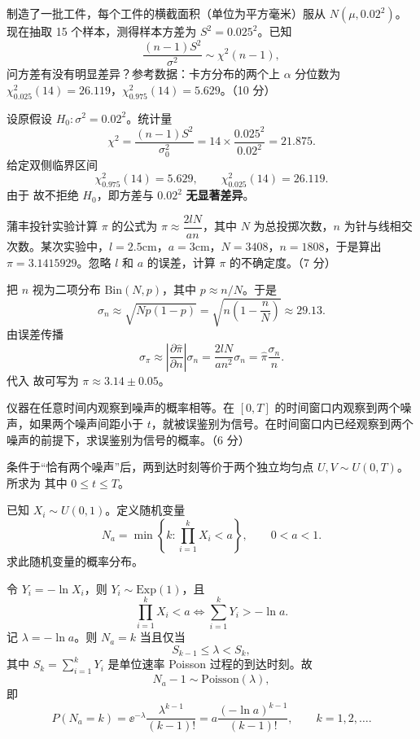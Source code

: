 \begin{question}
制造了一批工件，每个工件的横截面积（单位为平方毫米）服从 $N(\mu,0.02^2)$。现在抽取 15 个样本，测得样本方差为 $S^2=0.025^2$。已知
\[
\frac{(n-1)S^2}{\sigma^2}\sim \chi^2(n-1),
\]
问方差有没有明显差异？参考数据：卡方分布的两个上 $\alpha$ 分位数为 $\chi^2_{0.025}(14)=26.119$，$\chi^2_{0.975}(14)=5.629$。（10 分）
\begin{solution}
设原假设 $H_0:\sigma^2=0.02^2$。统计量
\[
\chi^2=\frac{(n-1)S^2}{\sigma_0^2}=14\times\frac{0.025^2}{0.02^2}=21.875.
\]
给定双侧临界区间
\[
\chi^2_{0.975}(14)=5.629,\qquad \chi^2_{0.025}(14)=26.119.
\]
由于
故不拒绝 $H_0$，即方差与 $0.02^2$ \textbf{无显著差异}。

\end{solution}
\end{question}

\begin{question}
蒲丰投针实验计算 $\pi$ 的公式为 $\pi\approx\dfrac{2lN}{an}$，其中 $N$ 为总投掷次数，$n$ 为针与线相交次数。某次实验中，$l=2.5\mathrm{cm}$，$a=3\mathrm{cm}$，$N=3408$，$n=1808$，于是算出 $\pi=3.1415929$。忽略 $l$ 和 $a$ 的误差，计算 $\pi$ 的不确定度。（7 分）
\begin{solution}
把 $n$ 视为二项分布 $\mathrm{Bin}(N,p)$，其中 $p\approx n/N$。于是
\[
\sigma_n\approx \sqrt{Np(1-p)}=\sqrt{n\left(1-\frac{n}{N}\right)}\approx 29.13.
\]
由误差传播
\[
\sigma_{\pi}\approx \left|\frac{\partial \hat\pi}{\partial n}\right|\sigma_n
=\frac{2lN}{a n^2}\sigma_n=\hat\pi\frac{\sigma_n}{n}.
\]
代入
故可写为 $\pi\approx 3.14\pm 0.05$。
\end{solution}
\end{question}

\begin{question}
仪器在任意时间内观察到噪声的概率相等。在 $[0,T]$ 的时间窗口内观察到两个噪声，如果两个噪声间距小于 $t$，就被误鉴别为信号。在时间窗口内已经观察到两个噪声的前提下，求误鉴别为信号的概率。（6 分）
\begin{solution}
条件于“恰有两个噪声”后，两到达时刻等价于两个独立均匀点 $U,V\sim U(0,T)$。所求为
其中 $0\le t\le T$。
\end{solution}
\end{question}

\begin{question}
已知 $X_i\sim U(0,1)$。定义随机变量
\[
N_a=\min\left\{k:\prod_{i=1}^{k}X_i<a\right\},\qquad 0<a<1.
\]
求此随机变量的概率分布。
\begin{solution}
令 $Y_i=-\ln X_i$，则 $Y_i\sim \mathrm{Exp}(1)$，且
\[
\prod_{i=1}^k X_i<a
\iff \sum_{i=1}^k Y_i>-\ln a.
\]
记 $\lambda=-\ln a$。则 $N_a=k$ 当且仅当
\[
S_{k-1}\le \lambda<S_k,
\]
其中 $S_k=\sum_{i=1}^k Y_i$ 是单位速率 Poisson 过程的到达时刻。故
\[
N_a-1\sim \mathrm{Poisson}(\lambda),
\]
即
\[
P(N_a=k)=\ee^{-\lambda}\frac{\lambda^{k-1}}{(k-1)!}
=a\frac{(-\ln a)^{k-1}}{(k-1)!},
\qquad k=1,2,\dots.
\]

\end{solution}
\end{question}


